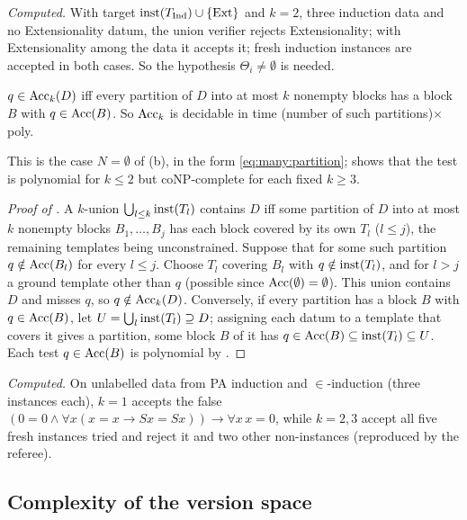 \noindent\emph{Computed.} With target $\mathrm{inst}(T_{\mathrm{Ind}})\cup\{\mathrm{Ext}\}$ and $k=2$, three induction data and no Extensionality datum, the union verifier rejects Extensionality; with Extensionality among the data it accepts it; fresh induction instances are accepted in both cases. So the hypothesis $\Theta_i\neq\emptyset$ is needed.

\begin{proposition}\label{prop:single:union-verifier}
$q\in\mathrm{Acc}_k(D)$ iff every partition of $D$ into at most $k$ nonempty blocks has a block $B$ with $q\in\mathrm{Acc}(B)$. So $\mathrm{Acc}_k$ is decidable in time (number of such partitions)$\times$poly.
\end{proposition}

\noindent This is the case $N=\emptyset$ of (b), in the form \eqref{eq:many:partition};  shows that the test is polynomial for $k\le2$ but coNP-complete for each fixed $k\ge3$.

\begin{proof}[Proof of ]
A $k$-union $\bigcup_{l\le k}\mathrm{inst}(T_l)$ contains $D$ iff some partition of $D$ into at most $k$ nonempty blocks $B_1,\dots,B_j$ has each block covered by its own $T_l$ ($l\le j$), the remaining templates being unconstrained. Suppose that for some such partition $q\notin\mathrm{Acc}(B_l)$ for every $l\le j$. Choose $T_l$ covering $B_l$ with $q\notin\mathrm{inst}(T_l)$, and for $l>j$ a ground template other than $q$ (possible since $\mathrm{Acc}(\emptyset)=\emptyset$). This union contains $D$ and misses $q$, so $q\notin\mathrm{Acc}_k(D)$. Conversely, if every partition has a block $B$ with $q\in\mathrm{Acc}(B)$, let $U=\bigcup_l\mathrm{inst}(T_l)\supseteq D$; assigning each datum to a template that covers it gives a partition, some block $B$ of it has $q\in\mathrm{Acc}(B)\subseteq\mathrm{inst}(T_l)\subseteq U$. Each test $q\in\mathrm{Acc}(B)$ is polynomial by .
\end{proof}

\noindent\emph{Computed.} On unlabelled data from PA induction and $\in$-induction (three instances each), $k=1$ accepts the false $(0=0\wedge\forall x(x=x\to Sx=Sx))\to\forall x\,x=0$, while $k=2,3$ accept all five fresh instances tried and reject it and two other non-instances (reproduced by the referee).

\subsection{Complexity of the version space}\label{app:single:complexity}

